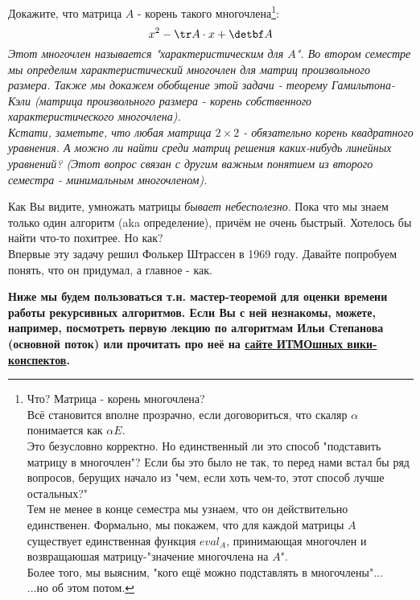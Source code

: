 	\begin{problem}
		Докажите, что матрица $A$ - корень такого многочлена\footnote{Что? Матрица - корень многочлена? 
			\\ Всё становится вполне прозрачно, если договориться, что скаляр $\alpha$ понимается как $\alpha E$. \\ Это безусловно корректно. Но единственный ли это способ "подставить матрицу в многочлен"? Если бы это было не так, то перед нами встал бы ряд вопросов, берущих начало из "чем, если хоть чем-то, этот способ лучше остальных?"
			\\ Тем не менее в конце семестра мы узнаем, что он действительно единственен. Формально, мы покажем, что для каждой матрицы $A$ существует единственная функция $eval_A$, принимающая многочлен и возвращаюшая матрицу-"значение многочлена на $A$". \\ Более того, мы выясним, "кого ещё можно подставлять в многочлены"... 
			\\ ...но об этом потом.}:
		$$x^2 - \tr A \cdot x + \detbf A$$
		\textit{Этот многочлен называется "характеристическим для $A$". Во втором семестре мы определим характеристический многочлен для матриц произвольного размера. Также мы докажем обобщение этой задачи - теорему Гамильтона-Кэли (матрица произвольного размера - корень собственного характеристического многочлена).\\
		Кстати, заметьте, что любая матрица $2 \times 2$ - обязательно корень квадратного уравнения. А можно ли найти среди матриц решения каких-нибудь линейных уравнений? (Этот вопрос связан с другим важным понятием из второго семестра - минимальным многочленом).} 
	\end{problem}

	
	Как Вы видите, умножать матрицы \textit{бывает небесполезно}. Пока что мы знаем только один алгоритм (aka определение), причём не очень быстрый. Хотелось бы найти что-то похитрее. Но как? \\
	Впервые эту задачу решил Фолькер Штрассен в 1969 году. Давайте попробуем понять, что он придумал, а главное - как. 
	
	\textbf{Ниже мы будем пользоваться т.н. мастер-теоремой для оценки времени работы рекурсивных алгоритмов. Если Вы с ней незнакомы, можете, например, посмотреть первую лекцию по алгоритмам Ильи Степанова (основной поток) или прочитать про неё на \href{https://neerc.ifmo.ru/wiki/}{сайте ИТМОшных вики-конспектов}.}
	
